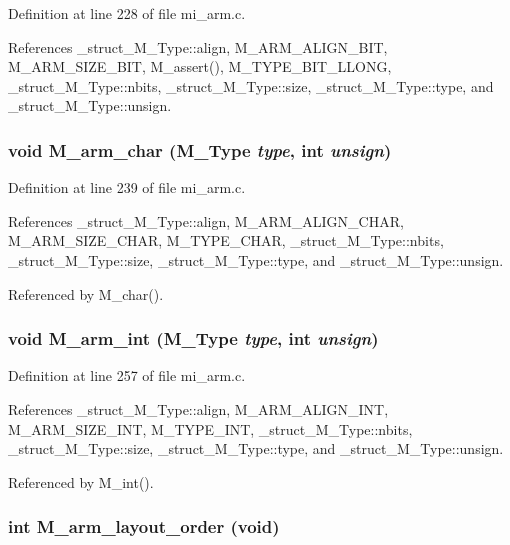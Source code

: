 Definition at line 228 of file mi\_\-arm.c.

References \_\-struct\_\-M\_\-Type::align, M\_\-ARM\_\-ALIGN\_\-BIT, M\_\-ARM\_\-SIZE\_\-BIT, M\_\-assert(), M\_\-TYPE\_\-BIT\_\-LLONG, \_\-struct\_\-M\_\-Type::nbits, \_\-struct\_\-M\_\-Type::size, \_\-struct\_\-M\_\-Type::type, and \_\-struct\_\-M\_\-Type::unsign.
\subsubsection{\setlength{\rightskip}{0pt plus 5cm}void M\_\-arm\_\-char (\bf{M\_\-Type} {\em type}, int {\em unsign})}\label{mi__arm_8c_91efb3c3d7b4ed345b47f495fe3cf2a0}




Definition at line 239 of file mi\_\-arm.c.

References \_\-struct\_\-M\_\-Type::align, M\_\-ARM\_\-ALIGN\_\-CHAR, M\_\-ARM\_\-SIZE\_\-CHAR, M\_\-TYPE\_\-CHAR, \_\-struct\_\-M\_\-Type::nbits, \_\-struct\_\-M\_\-Type::size, \_\-struct\_\-M\_\-Type::type, and \_\-struct\_\-M\_\-Type::unsign.

Referenced by M\_\-char().
\subsubsection{\setlength{\rightskip}{0pt plus 5cm}void M\_\-arm\_\-int (\bf{M\_\-Type} {\em type}, int {\em unsign})}\label{mi__arm_8c_f9432df5507a52b86271287d4723b72c}




Definition at line 257 of file mi\_\-arm.c.

References \_\-struct\_\-M\_\-Type::align, M\_\-ARM\_\-ALIGN\_\-INT, M\_\-ARM\_\-SIZE\_\-INT, M\_\-TYPE\_\-INT, \_\-struct\_\-M\_\-Type::nbits, \_\-struct\_\-M\_\-Type::size, \_\-struct\_\-M\_\-Type::type, and \_\-struct\_\-M\_\-Type::unsign.

Referenced by M\_\-int().
\subsubsection{\setlength{\rightskip}{0pt plus 5cm}int M\_\-arm\_\-layout\_\-order (void)}\label{mi__arm_8c_c006c4ffd74252084d8cb7573276dd43}




